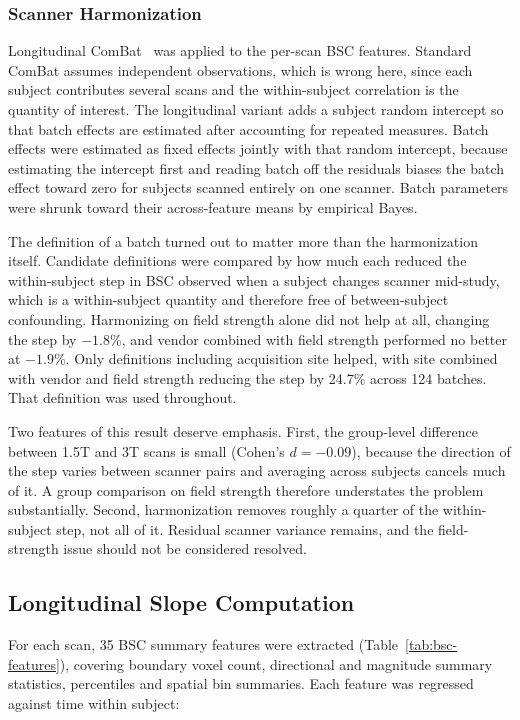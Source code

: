 \documentclass[blue]{ludusofficial}  %
\begin{document}
\subsubsection{Scanner Harmonization}

Longitudinal ComBat~\cite{beer2020longitudinal} was applied to the per-scan BSC features. Standard ComBat assumes independent observations, which is wrong here, since each subject contributes several scans and the within-subject correlation is the quantity of interest. The longitudinal variant adds a subject random intercept so that batch effects are estimated after accounting for repeated measures. Batch effects were estimated as fixed effects jointly with that random intercept, because estimating the intercept first and reading batch off the residuals biases the batch effect toward zero for subjects scanned entirely on one scanner. Batch parameters were shrunk toward their across-feature means by empirical Bayes.

The definition of a batch turned out to matter more than the harmonization itself. Candidate definitions were compared by how much each reduced the within-subject step in BSC observed when a subject changes scanner mid-study, which is a within-subject quantity and therefore free of between-subject confounding. Harmonizing on field strength alone did not help at all, changing the step by $-1.8\%$, and vendor combined with field strength performed no better at $-1.9\%$. Only definitions including acquisition site helped, with site combined with vendor and field strength reducing the step by 24.7\% across 124 batches. That definition was used throughout.

Two features of this result deserve emphasis. First, the group-level difference between 1.5T and 3T scans is small (Cohen's $d = -0.09$), because the direction of the step varies between scanner pairs and averaging across subjects cancels much of it. A group comparison on field strength therefore understates the problem substantially. Second, harmonization removes roughly a quarter of the within-subject step, not all of it. Residual scanner variance remains, and the field-strength issue should not be considered resolved.


\subsection{Longitudinal Slope Computation}

For each scan, 35 BSC summary features were extracted (Table~\ref{tab:bsc-features}), covering boundary voxel count, directional and magnitude summary statistics, percentiles and spatial bin summaries. Each feature was regressed against time within subject:
\end{document}

